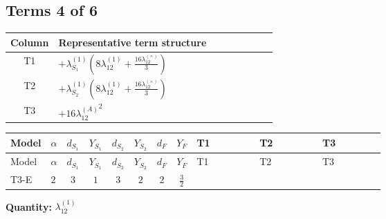 \documentclass[8pt]{article}
\begin{document}
\begin{landscape}
\subsection*{Terms 4 of 6}
\begin{center}
\begin{tabular}{@{}c >{\raggedright\arraybackslash}p{0.82\linewidth}@{}}
\toprule
Column & Representative term structure \\
\midrule
T1 & \(\displaystyle +{\lambda_{S_1}^{(1)}} \left(8 {\lambda_{12}^{(1)}}+\frac{16 {\lambda_{12}^{(\times)}}}{3}\right)\) \\
\midrule
T2 & \(\displaystyle +{\lambda_{S_2}^{(1)}} \left(8 {\lambda_{12}^{(1)}}+\frac{16 {\lambda_{12}^{(\times)}}}{3}\right)\) \\
\midrule
T3 & \(\displaystyle +16 {\lambda_{12}^{(A)}}^2\) \\
\midrule
\bottomrule
\end{tabular}
\end{center}
\smallskip
\tiny
\begin{longtable}{@{}llcccccc >{\raggedright\arraybackslash}p{0.21\linewidth} >{\raggedright\arraybackslash}p{0.21\linewidth} >{\raggedright\arraybackslash}p{0.21\linewidth}@{}}
\toprule
Model & $\alpha$ & $d_{S_1}$ & $Y_{S_1}$ & $d_{S_2}$ & $Y_{S_2}$ & $d_F$ & $Y_F$ & T1 & T2 & T3 \\
\midrule
\endfirsthead
\toprule
Model & $\alpha$ & $d_{S_1}$ & $Y_{S_1}$ & $d_{S_2}$ & $Y_{S_2}$ & $d_F$ & $Y_F$ & T1 & T2 & T3 \\
\midrule
\endhead
T3-E & $2$ & $3$ & $1$ & $3$ & $2$ & $2$ & $\frac{3}{2}$ & \scriptsize\adjustbox{max width=\linewidth}{$\begin{gathered} +{\lambda_{S_1}^{(1)}} \left(8 {\lambda_{12}^{(1)}}+\frac{16 {\lambda_{12}^{(\times)}}}{3}\right)\end{gathered}$} & \scriptsize\adjustbox{max width=\linewidth}{$\begin{gathered} +{\lambda_{S_2}^{(1)}} \left(8 {\lambda_{12}^{(1)}}+\frac{16 {\lambda_{12}^{(\times)}}}{3}\right)\end{gathered}$} & \scriptsize\adjustbox{max width=\linewidth}{$\begin{gathered} +16 {\lambda_{12}^{(A)}}^2\end{gathered}$} \\
\midrule
\bottomrule
\end{longtable}
\clearpage
\noindent\textbf{Quantity: }$\lambda_{12}^{(1)}$\par\smallskip

\end{landscape}
\end{document}
